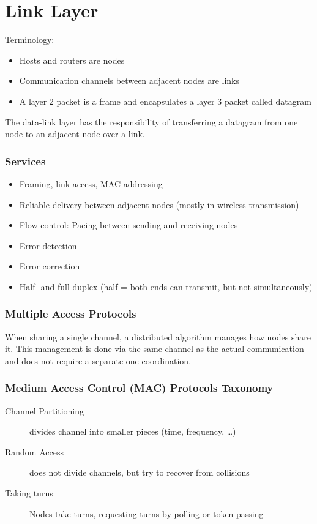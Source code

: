
\section{Link Layer}
Terminology:
\begin{itemize}
  \item Hosts and routers are nodes
  \item Communication channels between adjacent nodes are links
  \item A layer 2 packet is a frame and encapsulates a layer 3 packet called datagram
\end{itemize}

The data-link layer has the responsibility of transferring a datagram from one node to an adjacent node over a link.

\subsubsection*{Services}
\begin{itemize}
  \item Framing, link access, MAC addressing
  \item Reliable delivery between adjacent nodes (mostly in wireless transmission)
  \item Flow control: Pacing between sending and receiving nodes
  \item Error detection
  \item Error correction
  \item Half- and full-duplex (half = both ends can transmit, but not simultaneously)
\end{itemize}

\subsubsection*{Multiple Access Protocols}
When sharing a single channel, a distributed algorithm manages how nodes share it.
This management is done via the same channel as the actual communication and does not require a separate one coordination.

\subsubsection*{Medium Access Control (MAC) Protocols Taxonomy}
\begin{description}
  \item[Channel Partitioning] divides channel into smaller pieces (time, frequency, \dots)
  \item[Random Access] does not divide channels, but try to recover from collisions
  \item[Taking turns] Nodes take turns, requesting turns by polling or token passing
\end{description}

